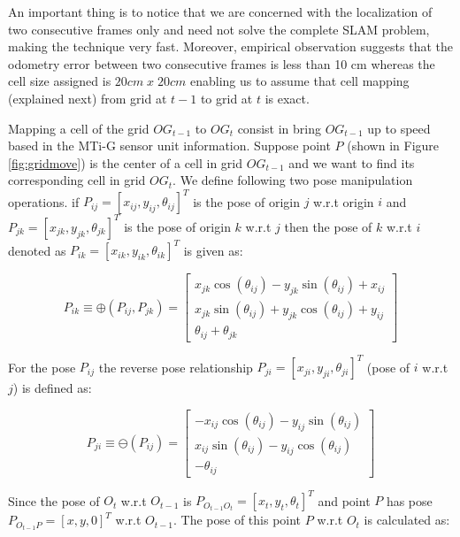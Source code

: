 An important thing is to notice that we are concerned with the localization of two consecutive frames only
and need not solve the complete SLAM problem, making the technique very fast. Moreover, empirical observation suggests that the odometry error between two consecutive frames is less than 10 cm whereas the cell size assigned is $20cm \; x \; 20cm$ enabling us to assume that cell mapping (explained next) from grid at $t-1$ to grid at $t$ is exact.

Mapping a cell of the grid $OG_{t-1}$ to $OG_t$ consist in bring $OG_{t-1}$ up to speed based in the MTi-G sensor unit information. Suppose point $P$ (shown in Figure \ref{fig:gridmove}) is the center of a cell in grid $OG_{t-1}$ and we want to find its corresponding cell in grid $OG_t$. We define following two pose manipulation operations. if $P_{ij}=[x_{ij}, y_{ij}, \theta_{ij}]^T$ is the pose of origin $j$ w.r.t origin $i$ and $P_{jk}=[x_{jk}, y_{jk}, \theta_{jk}]^T$ is the pose of origin $k$ w.r.t $j$ then the pose of $k$ w.r.t $i$ denoted as $P_{ik}=[x_{ik}, y_{ik}, \theta_{ik}]^T$ is given as:

\begin{equation}
P_{ik} \equiv \oplus (P_{ij}, P_{jk}) = \left[ \begin{array}{c}
x_{jk}\cos(\theta_{ij})-y_{jk}\sin(\theta_{ij})+x_{ij} \\
x_{jk}\sin(\theta_{ij})+y_{jk}\cos(\theta_{ij})+y_{ij} \\
\theta_{ij}+\theta_{jk} \end{array} \right] 
\label{eq:composepose}
\end{equation}

For the pose $P_{ij}$ the reverse pose relationship $P_{ji}=[x_{ji}, y_{ji}, \theta_{ji}]^T$ (pose of $i$ w.r.t $j$) is defined as:

\begin{equation}
P_{ji} \equiv \ominus (P_{ij}) = \left[ \begin{array}{c}
-x_{ij}\cos(\theta_{ij})-y_{ij}\sin(\theta_{ij}) \\
x_{ij}\sin(\theta_{ij})-y_{ij}\cos(\theta_{ij}) \\
-\theta_{ij} \end{array} \right] 
\label{eq:invpose}
\end{equation}

Since the pose of $O_t$ w.r.t $O_{t-1}$ is $P_{O_{t-1}O_t}=[x_t,y_t,\theta_t]^T$ and point $P$ has pose $P_{O_{t-1}P}=[x,y,0]^T$ w.r.t $O_{t-1}$. The pose of this point $P$ w.r.t $O_t$ is calculated as:

